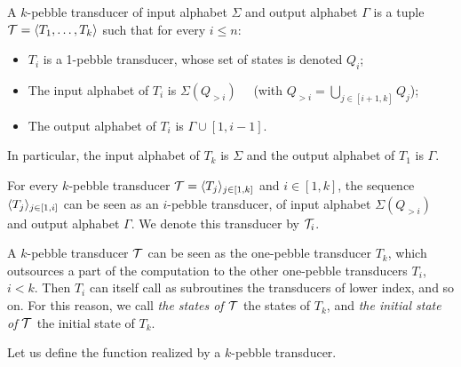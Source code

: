 \begin{definition}%
  A $k$-pebble transducer of input alphabet $\Sigma$ and output alphabet $\Gamma$ is a tuple ${\mathcal T}=\langle T_1,\dots,T_{k} \rangle$ such that for every $i\leq n$:
  \begin{itemize}
  \item  $T_i$ is a 1-pebble transducer, whose set of states is denoted $Q_i$;
  \item  The input alphabet of $T_i$ is $\Sigma(Q_{>i})\quad$ (with $Q_{>i}=\bigcup_{j\in [i+1,k]}Q_j$);
  \item  The output alphabet of $T_i$ is $\Gamma \cup [1,i-1]$.
  \end{itemize} 
  In particular, the input alphabet of $T_k$ is $\Sigma$ and the output alphabet of $T_1$ is $\Gamma$.%
  \end{definition}


For every $k$-pebble transducer ${\mathcal T}=\langle T_j \rangle_{j\in[1,k]}$ and $i\in[1,k]$,  the sequence $\langle T_j \rangle_{j\in[1,i]}$ can be seen as an $i$-pebble transducer, of input alphabet $\Sigma(Q_{>i})$ and output alphabet $\Gamma$. We denote this transducer by ${\mathcal T}_i$.
 
 \medskip
\begin{terminology} 
 A $k$-pebble transducer ${\mathcal T}$ can be seen as the one-pebble transducer $T_k$, which outsources a part of the computation to the other one-pebble transducers $T_i$, $i<k$. Then $T_i$ can itself call as subroutines the transducers of lower index, and so on.
 For this reason, we call \emph{the states of ${\mathcal T}$} the states of $T_k$, and \emph{the initial state of ${\mathcal T}$} the initial state of $T_k$. 
  \end{terminology}
  
  \smallskip
 Let us define the function realized by a $k$-pebble transducer. 
  
